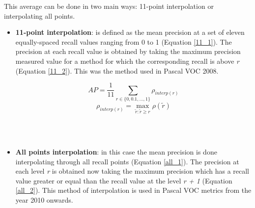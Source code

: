 \begin{itemize}
\begin{figure}[H]
\begin{center}
    \end{center}
    \end{figure}
    This average can be done in two main ways: 11-point interpolation or interpolating all points.
    \begin{itemize}
        \item \textbf{11-point interpolation}: is defined as the mean precision at a set of eleven equally-spaced recall values ranging from 0 to 1 (Equation \ref{11_1}). The precision at each recall value is obtained by taking the maximum precision measured value for a method for which the corresponding recall is above \textit{r} (Equation \ref{11_2}). This was the method used in Pascal VOC 2008.
        \begin{center}
        \begin{equation}\label{11_1}
            AP = \frac{1}{11}\sum_{r\in{\{0,0.1,...,1\}}}\rho_{interp(r)}
        \end{equation}
        \begin{equation}\label{11_2}
            \rho_{interp(r)}= \max_{\tilde{r}:\tilde{r}\geq r}{\rho(\tilde{r})}
        \end{equation}
        \end{center}
        \\ \ \\
        \item \textbf{All points interpolation}: in this case the mean precision is done interpolating through all recall points (Equation \ref{all_1}). The precision at each level \textit{r} is obtained now taking the maximum precision which has a recall value greater or equal than the recall value at the level \textit{r + 1} (Equation \ref{all_2}). This method of interpolation is used in Pascal VOC metrics from the year 2010 onwards.
    

\end{itemize}
\end{itemize}
